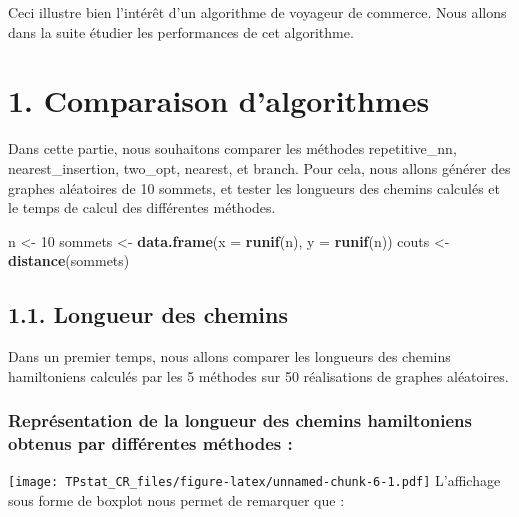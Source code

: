 \documentclass[
]{article}
\newenvironment{Shaded}{\begin{snugshade}}{\end{snugshade}}
\newcommand{\DataTypeTok}[1]{\textcolor[rgb]{0.13,0.29,0.53}{#1}}
\newcommand{\DecValTok}[1]{\textcolor[rgb]{0.00,0.00,0.81}{#1}}
\newcommand{\KeywordTok}[1]{\textcolor[rgb]{0.13,0.29,0.53}{\textbf{#1}}}
\newcommand{\NormalTok}[1]{#1}
\newcommand{\StringTok}[1]{\textcolor[rgb]{0.31,0.60,0.02}{#1}}
\begin{document}
Ceci illustre bien l'intérêt d'un algorithme de voyageur de commerce.
Nous allons dans la suite étudier les performances de cet algorithme.

\hypertarget{comparaison-dalgorithmes}{%
\section{1. Comparaison d'algorithmes}\label{comparaison-dalgorithmes}}

Dans cette partie, nous souhaitons comparer les méthodes repetitive\_nn,
nearest\_insertion, two\_opt, nearest, et branch. Pour cela, nous allons
générer des graphes aléatoires de 10 sommets, et tester les longueurs
des chemins calculés et le temps de calcul des différentes méthodes.

\begin{Shaded}
\begin{Highlighting}[]
\NormalTok{      n \textless{}{-}}\StringTok{ }\DecValTok{10}
\NormalTok{sommets \textless{}{-}}\StringTok{ }\KeywordTok{data.frame}\NormalTok{(}\DataTypeTok{x =} \KeywordTok{runif}\NormalTok{(n), }\DataTypeTok{y =} \KeywordTok{runif}\NormalTok{(n))}
\NormalTok{  couts \textless{}{-}}\StringTok{ }\KeywordTok{distance}\NormalTok{(sommets)}
\end{Highlighting}
\end{Shaded}

\hypertarget{longueur-des-chemins}{%
\subsection{1.1. Longueur des chemins}\label{longueur-des-chemins}}

Dans un premier temps, nous allons comparer les longueurs des chemins
hamiltoniens calculés par les 5 méthodes sur 50 réalisations de graphes
aléatoires.

\hypertarget{repruxe9sentation-de-la-longueur-des-chemins-hamiltoniens-obtenus-par-diffuxe9rentes-muxe9thodes}{%
\subsubsection{Représentation de la longueur des chemins hamiltoniens
obtenus par différentes méthodes
:}\label{repruxe9sentation-de-la-longueur-des-chemins-hamiltoniens-obtenus-par-diffuxe9rentes-muxe9thodes}}

\texttt{[image: TPstat\_CR\_files/figure-latex/unnamed-chunk-6-1.pdf]}
L'affichage sous forme de boxplot nous permet de remarquer que :
\end{document}
